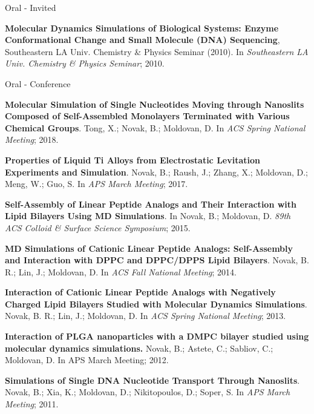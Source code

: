 \pagebreak


\begin{cventries}
  \cventry
    {} %
    {Oral - Invited} %
    {} %
    {} %
    {
      \begin{cvitems} %
        \item {\textbf{Molecular Dynamics Simulations of Biological Systems: Enzyme Conformational Change and Small Molecule (DNA) Sequencing}, Southeastern LA Univ. Chemistry \& Physics Seminar (2010). In \textit{Southeastern LA Univ. Chemistry \& Physics Seminar}; 2010.}
      \end{cvitems}
    }
    
  \cventry
    {} %
    {Oral - Conference} %
    {} %
    {} %
    {
      \begin{cvitems} 
        \item {\textbf{Molecular Simulation of Single Nucleotides Moving through Nanoslits Composed of Self-Assembled Monolayers Terminated with Various Chemical Groups}. Tong, X.; Novak, B.; Moldovan, D. In \textit{ACS Spring National Meeting}; 2018.}
        \item {\textbf{Properties of Liquid Ti Alloys from Electrostatic Levitation Experiments and Simulation}. Novak, B.; Raush, J.; Zhang, X.; Moldovan, D.; Meng, W.; Guo, S. In \textit{APS March Meeting}; 2017.}
        \item {\textbf{Self-Assembly of Linear Peptide Analogs and Their Interaction with Lipid Bilayers Using MD Simulations}. In Novak, B.; Moldovan, D. \textit{89th ACS Colloid \& Surface Science Symposium}; 2015.}
        \item {\textbf{MD Simulations of Cationic Linear Peptide Analogs: Self-Assembly and Interaction with DPPC and DPPC/DPPS Lipid Bilayers}. Novak, B. R.; Lin, J.; Moldovan, D. In \textit{ACS Fall National Meeting}; 2014.}
        \item {\textbf{Interaction of Cationic Linear Peptide Analogs with Negatively Charged Lipid Bilayers Studied with Molecular Dynamics Simulations}. Novak, B. R.; Lin, J.; Moldovan, D. In \textit{ACS Spring National Meeting}; 2013.}
        \item {\textbf{Interaction of PLGA nanoparticles with a DMPC bilayer studied using molecular dynamics simulations.} Novak, B.; Astete, C.; Sabliov, C.; Moldovan, D. In APS March Meeting; 2012.}
        \item {\textbf{Simulations of Single DNA Nucleotide Transport Through Nanoslits}. Novak, B.; Xia, K.; Moldovan, D.; Nikitopoulos, D.; Soper, S. In \textit{APS March Meeting}; 2011.}

\end{cvitems}}
\end{cventries}
